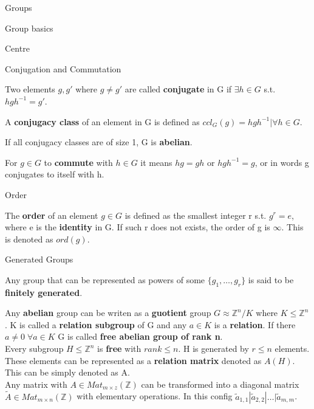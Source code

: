 \documentclass[12pt, letterpaper]{article}
\begin{document}
\begin{section}{Groups}
\begin{subsection}{Group basics}
\begin{subsubsection}{Centre}
    \end{subsubsection}

    \begin{subsubsection}{Conjugation and Commutation}

      Two elements \(g, g'\) where \(g \neq g'\) are called \textbf{conjugate} in G
      if \(\exists h \in G \) s.t. \(hgh^{-1} = g'\).

      A \textbf{conjugacy class} of an element in G is defined as
      \(ccl_{G}(g) = {hgh^{-1} | \forall h \in G}\).

      If all conjugacy classes are of size 1, G is \textbf{abelian}.

      For \(g \in G\) to \textbf{commute} with \(h \in G\) it means \(hg = gh\)
      or \(hgh^{-1} = g\), or in words g conjugates to itself with h.

    \end{subsubsection}

    \begin{subsubsection}{Order}

      The \textbf{order} of an element \(g \in G\) is defined as the smallest
      integer r s.t. \(g^{r} = e\), where e is the \textbf{identity} in G.
      If such r does not exists, the order of g is \(\infty\).
      This is denoted as \(ord(g)\).

    \end{subsubsection}

    \begin{subsubsection}{Generated Groups}

      Any group that can be represented as powers of some
      \(\{ g_{1}, \dots , g_{r} \}\) is said to be \textbf{finitely generated}.

      Any \textbf{abelian} group can be writen as a \textbf{guotient} group
      \(G \approx \mathbb{Z}^{n} / K\) where \(K \leq \mathbb{Z}^{n}\). K is
      called a \textbf{relation subgroup} of G and any \(a \in K\) is a
      \textbf{relation}. If there \(a \neq 0 \; \forall a \in K\) G is called
      \textbf{free abelian group of rank n}. \\
      Every subgroup \(H \leq \mathbb{Z}^{n}\) is \textbf{free} with
      \(rank \leq n\). H is generated by \(r \leq n\) elements. These elements
      can be represented as a \textbf{relation matrix} denoted as \(A(H)\).
      This can be simply denoted as A.  \\
      Any matrix with \(A \in Mat_{m \times z}(\mathbb{Z})\) can be transformed
      into a diagonal matrix \(\tilde{A} \in Mat_{m \times n}(\mathbb{Z})\) with
      elementary operations. In this config
      \(\tilde{a}_{1, 1} | \tilde{a}_{2, 2} | \dots | \tilde{a}_{m, m}\).


\end{subsubsection}
\end{subsection}
\end{section}
\end{document}
